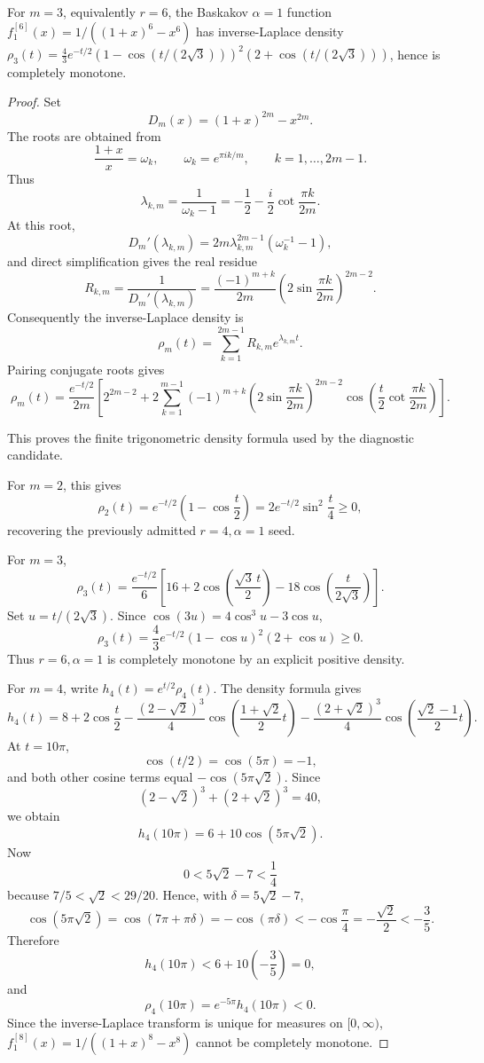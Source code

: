 \begin{proposition}
\label{res:baskakov-alpha1-r6-positive-density-factorization}
For \(m=3\), equivalently \(r=6\), the Baskakov \(\alpha=1\) function \(f^{[6]}_1(x)=1/((1+x)^6-x^6)\) has inverse-Laplace density \(\rho_3(t)=\frac{4}{3}e^{-t/2}(1-\cos(t/(2\sqrt3)))^2(2+\cos(t/(2\sqrt3)))\), hence is completely monotone.
\end{proposition}
\begin{proof}
Set
\[
D_m(x)=(1+x)^{2m}-x^{2m}.
\]
The roots are obtained from
\[
\frac{1+x}{x}=\omega_k,\qquad
\omega_k=e^{\pi i k/m},\qquad k=1,\ldots,2m-1.
\]
Thus
\[
\lambda_{k,m}
=\frac{1}{\omega_k-1}
=-\frac12-\frac{i}{2}\cot\frac{\pi k}{2m}.
\]
At this root,
\[
D_m'(\lambda_{k,m})
=2m\lambda_{k,m}^{2m-1}(\omega_k^{-1}-1),
\]
and direct simplification gives the real residue
\[
R_{k,m}
=\frac{1}{D_m'(\lambda_{k,m})}
=\frac{(-1)^{m+k}}{2m}
\left(2\sin\frac{\pi k}{2m}\right)^{2m-2}.
\]
Consequently the inverse-Laplace density is
\[
\rho_m(t)
=\sum_{k=1}^{2m-1}R_{k,m}e^{\lambda_{k,m}t}.
\]
Pairing conjugate roots gives
\[
\rho_m(t)
=\frac{e^{-t/2}}{2m}
\left[
2^{2m-2}
+2\sum_{k=1}^{m-1}
(-1)^{m+k}
\left(2\sin\frac{\pi k}{2m}\right)^{2m-2}
\cos\!\left(
\frac{t}{2}\cot\frac{\pi k}{2m}
\right)
\right].
\]

This proves the finite trigonometric density formula used by the diagnostic
candidate.

For \(m=2\), this gives
\[
\rho_2(t)=e^{-t/2}\left(1-\cos\frac t2\right)
=2e^{-t/2}\sin^2\frac t4\ge0,
\]
recovering the previously admitted \(r=4,\alpha=1\) seed.

For \(m=3\),
\[
\rho_3(t)
=\frac{e^{-t/2}}6
\left[
16+2\cos\left(\frac{\sqrt3\,t}{2}\right)
-18\cos\left(\frac{t}{2\sqrt3}\right)
\right].
\]
Set \(u=t/(2\sqrt3)\).  Since
\(\cos(3u)=4\cos^3u-3\cos u\),
\[
\rho_3(t)
=\frac{4}{3}e^{-t/2}(1-\cos u)^2(2+\cos u)\ge0.
\]
Thus \(r=6,\alpha=1\) is completely monotone by an explicit positive density.

For \(m=4\), write \(h_4(t)=e^{t/2}\rho_4(t)\).  The density formula gives
\[
h_4(t)
=8+2\cos\frac t2
-\frac{(2-\sqrt2)^3}{4}
\cos\left(\frac{1+\sqrt2}{2}t\right)
-\frac{(2+\sqrt2)^3}{4}
\cos\left(\frac{\sqrt2-1}{2}t\right).
\]
At \(t=10\pi\),
\[
\cos(t/2)=\cos(5\pi)=-1,
\]
and both other cosine terms equal \(-\cos(5\pi\sqrt2)\).  Since
\[
(2-\sqrt2)^3+(2+\sqrt2)^3=40,
\]
we obtain
\[
h_4(10\pi)=6+10\cos(5\pi\sqrt2).
\]
Now
\[
0<5\sqrt2-7<\frac14
\]
because \(7/5<\sqrt2<29/20\).  Hence, with
\(\delta=5\sqrt2-7\),
\[
\cos(5\pi\sqrt2)=\cos(7\pi+\pi\delta)=-\cos(\pi\delta)
<-\cos\frac\pi4=-\frac{\sqrt2}{2}<-\frac35.
\]
Therefore
\[
h_4(10\pi)<6+10\left(-\frac35\right)=0,
\]
and
\[
\rho_4(10\pi)=e^{-5\pi}h_4(10\pi)<0.
\]
Since the inverse-Laplace transform is unique for measures on
\([0,\infty)\), \(f^{[8]}_1(x)=1/((1+x)^8-x^8)\) cannot be completely monotone.
\end{proof}


